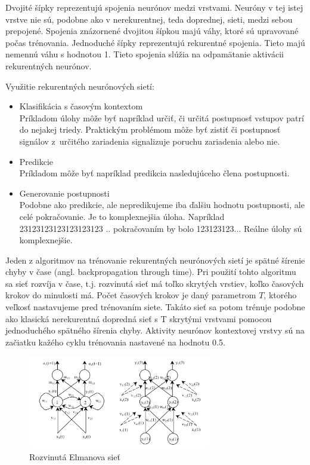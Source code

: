 Dvojité šípky reprezentujú spojenia neurónov medzi vrstvami. Neuróny v tej istej vrstve nie sú, podobne ako
v nerekurentnej, teda doprednej, sieti, medzi sebou prepojené. Spojenia znázornené dvojitou šípkou majú váhy, ktoré 
sú upravované počas trénovania.
Jednoduché šípky reprezentujú rekurentné spojenia. Tieto majú nemennú váhu s hodnotou 1.
Tieto spojenia slúžia na odpamätanie aktivácii rekurentných neurónov. 

Využitie rekurentných neurónových sietí: \\
\begin{itemize}
	\item Klasifikácia s časovým kontextom \\
	Príkladom úlohy môže byť napríklad určiť, či určitá postupnosť vstupov patrí do nejakej triedy.
	Praktickým problémom môže byť zistiť či postupnosť signálov z~určitého zariadenia signalizuje poruchu zariadenia alebo nie.
	\item Predikcie\\
	Príkladom môže byť napríklad predikcia nasledujúceho člena postupnosti.
	\item Generovanie postupnosti\\
	Podobne ako predikcie, ale nepredikujeme iba ďalšiu hodnotu postupnosti, ale celé pokračovanie.
	Je to komplexnejšia úloha. Napríklad 23123123123123123123 .. pokračovaním by bolo 123123123...
	Reálne úlohy sú komplexnejšie.
\end{itemize}
Jeden z algoritmov na trénovanie rekurentných neurónových sietí
je spätné šírenie chyby v čase (angl. backpropagation through time).
Pri použití tohto algoritmu sa sieť rozvíja v čase, t.j. rozvinutá sieť má
toľko skrytých vrstiev, koľko časových krokov do minulosti má. 
Počet časových krokov je daný parametrom $T$, ktorého veľkosť nastavujeme pred trénovaním siete.
Takáto sieť sa potom trénuje podobne ako klasická nerekurentná dopredná sieť s T skrytými vrstvami pomocou jednoduchého spätného šírenia chyby.
Aktivity neurónov kontextovej vrstvy sú na začiatku kažého cyklu trénovania nastavené
na hodnotu 0.5.


\begin{figure}[H]
	\centering
	\includegraphics[width=8cm]{assets/elman}
	\caption{Rozvinutá Elmanova sieť \protect\cite{navrat}}
\end{figure}


